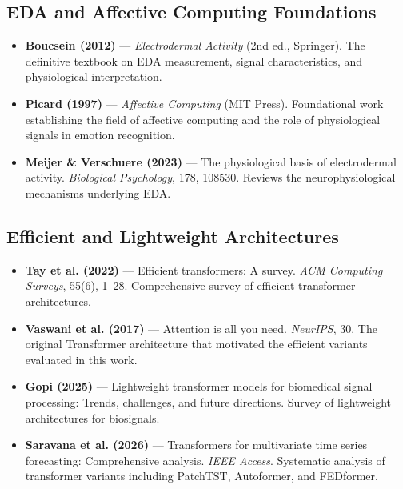 \documentclass[runningheads]{llncs}
\begin{document}
\subsection*{EDA and Affective Computing Foundations}
\begin{itemize}
    \item \textbf{Boucsein (2012)} — \textit{Electrodermal Activity} (2nd ed., Springer). The definitive textbook on EDA measurement, signal characteristics, and physiological interpretation.
    \item \textbf{Picard (1997)} — \textit{Affective Computing} (MIT Press). Foundational work establishing the field of affective computing and the role of physiological signals in emotion recognition.
    \item \textbf{Meijer \& Verschuere (2023)} — The physiological basis of electrodermal activity. \textit{Biological Psychology}, 178, 108530. Reviews the neurophysiological mechanisms underlying EDA.
\end{itemize}

\subsection*{Efficient and Lightweight Architectures}
\begin{itemize}
    \item \textbf{Tay et al. (2022)} — Efficient transformers: A survey. \textit{ACM Computing Surveys}, 55(6), 1--28. Comprehensive survey of efficient transformer architectures.
    \item \textbf{Vaswani et al. (2017)} — Attention is all you need. \textit{NeurIPS}, 30. The original Transformer architecture that motivated the efficient variants evaluated in this work.
    \item \textbf{Gopi (2025)} — Lightweight transformer models for biomedical signal processing: Trends, challenges, and future directions. Survey of lightweight architectures for biosignals.
    \item \textbf{Saravana et al. (2026)} — Transformers for multivariate time series forecasting: Comprehensive analysis. \textit{IEEE Access}. Systematic analysis of transformer variants including PatchTST, Autoformer, and FEDformer.
\end{itemize}
\end{document}
